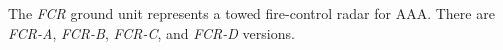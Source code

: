 
The \emph{FCR} ground unit represents a towed fire-control radar for AAA. There are \emph{FCR-A}, \emph{FCR-B}, \emph{FCR-C}, and \emph{FCR-D} versions.
